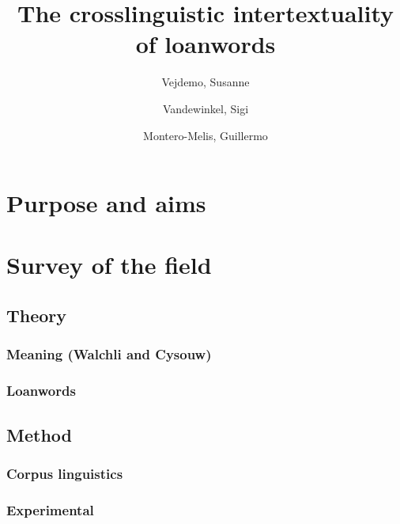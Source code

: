 \documentclass[a4paper]{article}
\title{The crosslinguistic intertextuality of loanwords}
\author{Vejdemo, Susanne \and Vandewinkel, Sigi \and Montero-Melis, Guillermo}
\begin{document}
\maketitle


\section{Purpose and aims}






\section{Survey of the field}


\subsection{Theory}


\subsubsection{Meaning (Walchli and Cysouw)}




\subsubsection{Loanwords}



\subsection{Method}


\subsubsection{Corpus linguistics}



\subsubsection{Experimental}







\end{document}
